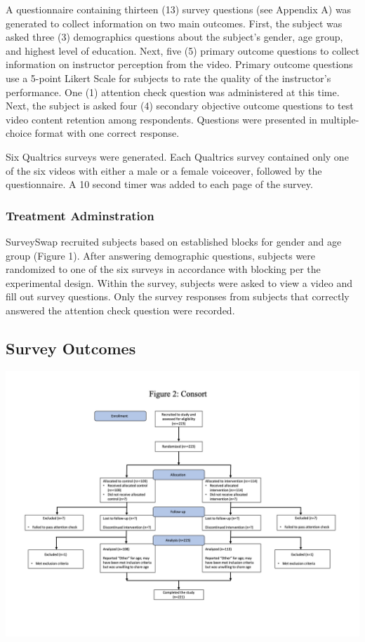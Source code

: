 \documentclass[
]{article}
\begin{document}
A questionnaire containing thirteen (13) survey questions (see Appendix
A) was generated to collect information on two main outcomes. First, the
subject was asked three (3) demographics questions about the subject's
gender, age group, and highest level of education. Next, five (5)
primary outcome questions to collect information on instructor
perception from the video. Primary outcome questions use a 5-point
Likert Scale for subjects to rate the quality of the instructor's
performance. One (1) attention check question was administered at this
time. Next, the subject is asked four (4) secondary objective outcome
questions to test video content retention among respondents. Questions
were presented in multiple-choice format with one correct response.

Six Qualtrics surveys were generated. Each Qualtrics survey contained
only one of the six videos with either a male or a female voiceover,
followed by the questionnaire. A 10 second timer was added to each page
of the survey.

\hypertarget{treatment-adminstration}{%
\subsubsection{Treatment Adminstration}\label{treatment-adminstration}}

SurveySwap recruited subjects based on established blocks for gender and
age group (Figure 1). After answering demographic questions, subjects
were randomized to one of the six surveys in accordance with blocking
per the experimental design. Within the survey, subjects were asked to
view a video and fill out survey questions. Only the survey responses
from subjects that correctly answered the attention check question were
recorded.

\hypertarget{survey-outcomes}{%
\subsection{Survey Outcomes}\label{survey-outcomes}}

\begin{center}\includegraphics[width=0.9\linewidth,height=0.9\textheight]{images/consort} \end{center}
\end{document}
